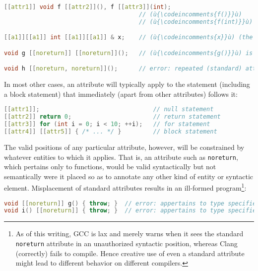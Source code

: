 \begin{lstlisting}[language=C++]
[[attr1]] void f [[attr2]](), f [[attr3]](int);
                                      // (ù{\codeincomments{f()}}ù)    is (ù{\codeincomments{attr1}}ù) and (ù{\codeincomments{attr2}}ù).
                                      // (ù{\codeincomments{f(int)}}ù) is (ù{\codeincomments{attr1}}ù) and (ù{\codeincomments{attr3}}ù).

[[a1]][[a1]] int [[a1]][[a1]] & x;    // (ù{\codeincomments{x}}ù) (the reference itself) is (ù{\codeincomments{a1}}ù).

void g [[noreturn]] [[noreturn]]();   // (ù{\codeincomments{g()}}ù) is (ù{\codeincomments{noreturn}}ù).

void h [[noreturn, noreturn]]();      // error: repeated (standard) attribute
\end{lstlisting}
    
\noindent In most other cases, an attribute will typically apply to the statement
(including a block statement) that immediately (apart from other
attributes) follows it:

\begin{lstlisting}[language=C++]
[[attr1]];                                // null statement
[[attr2]] return 0;                       // return statement
[[attr3]] for (int i = 0; i < 10; ++i);   // for statement
[[attr4]] [[attr5]] { /* ... */ }         // block statement
\end{lstlisting}
    
\noindent The valid positions of any particular attribute, however, will be
constrained by whatever entities to which it applies. That is, an
attribute such as \texttt{noreturn}, which pertains only to functions,
would be valid syntactically but not semantically were it placed so as
to annotate any other kind of entity or syntactic element. Misplacement of
standard attributes results in an ill-formed
program{\cprotect\footnote{As of this writing, GCC is lax and merely
warns when it sees the standard \texttt{noreturn} attribute in an
unauthorized syntactic position, whereas Clang (correctly) fails to
compile. Hence creative use of even a standard attribute might
  lead to different behavior on different compilers.}}:

\begin{lstlisting}[language=C++]
void [[noreturn]] g() { throw; }  // error: appertains to type specifier
void i() [[noreturn]] { throw; }  // error: appertains to type specifier
\end{lstlisting}
    

